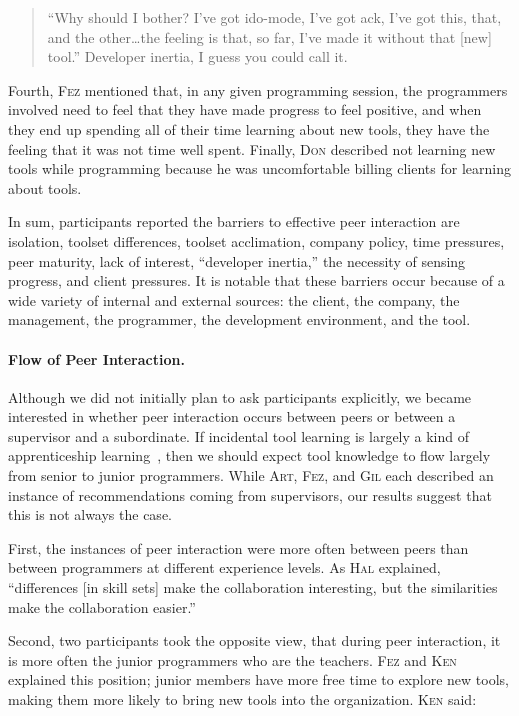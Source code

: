 \documentclass[smallextended]{svjour3}
\newcommand\discovery{peer interaction\xspace}
\newcommand\DisCovery{Peer Interaction\xspace}
\newcommand{\subject}[1]{\textsc{#1}}
\newcommand{\fsub}{{\subject{Art}}\xspace}
\newcommand{\hsub}{{\subject{Fez}}\xspace}
\newcommand{\msub}{{\subject{Don}}\xspace}
\newcommand{\osub}{{\subject{Ken}}\xspace}
\newcommand{\psub}{{\subject{Hal}}\xspace}
\newcommand{\rsub}{{\subject{Gil}}\xspace}
\begin{document}
\begin{quote}
``Why should I bother?  I've got ido-mode, I've got ack, I've got this, that,
and the other\ldots the feeling is that, so far, I've made it without that
[new] tool.''
Developer inertia, I guess you could call it.
\end{quote}

\noindent
Fourth, \hsub mentioned that, in any given programming session, the programmers
involved need to feel that they have made progress to feel positive, and when
they end up spending all of their time learning about new tools, they have the
feeling that it was not time well spent.
Finally, \msub described not learning new tools while programming because he
was uncomfortable billing clients for learning about tools.

In sum, participants reported the barriers to effective \discovery are 
isolation, toolset differences, toolset acclimation, company policy, time
pressures, peer maturity, lack of interest, ``developer inertia,''
the necessity of sensing progress, and client pressures.
It is notable that these barriers occur because of a wide variety of
internal and external sources: the client, the company, the
management, the programmer, the development environment, and the tool.

\paragraph{Flow of \DisCovery.}\label{sec:flow}

\noindent
Although we did not initially plan to ask participants explicitly, we became interested in
whether \discovery occurs between peers or between a supervisor
and a subordinate.
If incidental tool learning is largely a kind of 
apprenticeship learning~\citep{lave}, then we should expect tool knowledge to
flow largely from senior to junior programmers.
While \fsub, \hsub, and \rsub each described an instance of recommendations
coming from supervisors, our results suggest that this is not always the case.

First, the instances of \discovery were more often between peers
than between programmers at different experience levels.
As \psub explained, ``differences [in skill sets] make the collaboration
interesting, but the similarities make the collaboration easier.''

Second, two participants took the opposite view, that during \discovery, it is more often
the junior programmers who are the teachers. 
\hsub and \osub explained this position; junior members have more
free time to explore new tools, making them more likely to bring new tools
into the organization.
\osub said:
\end{document}
